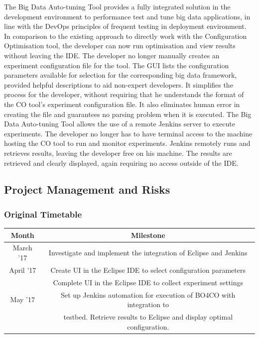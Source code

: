 The Big Data Auto-tuning Tool provides a fully integrated solution in the development environment to performance test and tune big data applications, in line with the DevOps principles of frequent testing in deployment environment. In comparison to the existing approach to directly work with the Configuration Optimisation tool, the developer can now run optimisation and view results without leaving the IDE. The developer no longer manually creates an experiment configuration file for the tool. The GUI lists the configuration parameters available for selection for the corresponding big data framework, provided helpful descriptions to aid non-expert developers. It simplifies the process for the developer, without requiring that he understands the format of the CO tool's experiment configuration file. It also eliminates human error in creating the file and guarantees no parsing problem when it is executed. The Big Data Auto-tuning Tool allows the use of a remote Jenkins server to execute experiments. The developer no longer has to have terminal access to the machine hosting the CO tool to run and monitor experiments. Jenkins remotely runs and retrieves results, leaving the developer free on his machine. The results are retrieved and clearly displayed, again requiring no access outside of the IDE. 

\newpage
\subsection{Project Management and Risks}
\subsubsection{Original Timetable}
\begin{center}
\begin{tabular}{|c|c|}
\hline
Month & Milestone\\
\hline
March '17 & Investigate and implement the integration of Eclipse and Jenkins\\
\hline
April '17 & Create UI in the Eclipse IDE to select configuration parameters\\
 & Complete UI in the Eclipse IDE to collect experiment settings\\
\hline
May '17 & Set up Jenkins automation for execution of BO4CO with integration to\\
&  testbed. Retrieve results to Eclipse and display optimal configuration.\\
\hline
\end{tabular}
\end{center}

